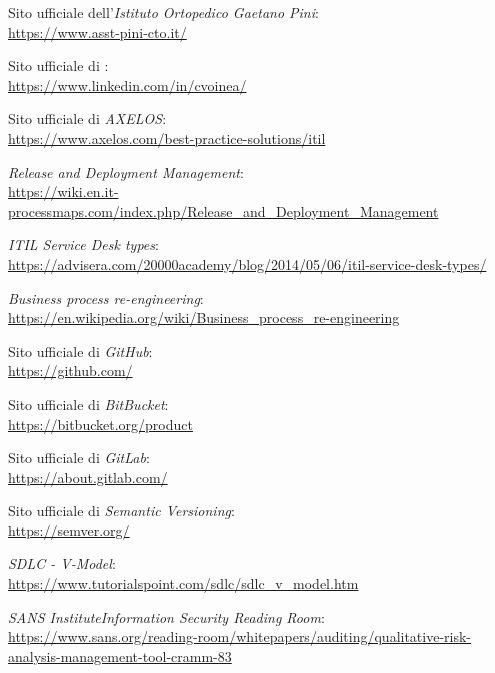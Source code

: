 \begin{thebibliography}{9}

	Sito ufficiale dell'\textit{Istituto Ortopedico Gaetano Pini}:\\
	\url{https://www.asst-pini-cto.it/}
	
	Sito ufficiale di \textit{\azienda}:\\
	\url{https://www.linkedin.com/in/cvoinea/}

	Sito ufficiale di \textit{AXELOS}:\\
	\url{https://www.axelos.com/best-practice-solutions/itil}

	\textit{Release and Deployment Management}:\\
	\url{https://wiki.en.it-processmaps.com/index.php/Release_and_Deployment_Management}

	\textit{ITIL Service Desk types}:\\
	\url{https://advisera.com/20000academy/blog/2014/05/06/itil-service-desk-types/}
	
	\textit{Business process re-engineering}:\\
	\url{https://en.wikipedia.org/wiki/Business_process_re-engineering}
	

	Sito ufficiale di \textit{GitHub}:\\
	\url{https://github.com/}

	Sito ufficiale di \textit{BitBucket}:\\
	\url{https://bitbucket.org/product}

	Sito ufficiale di \textit{GitLab}:\\
	\url{https://about.gitlab.com/}
	
	Sito ufficiale di \textit{Semantic Versioning}:\\
	\url{https://semver.org/}
	
	\textit{SDLC - V-Model}:\\
	\url{https://www.tutorialspoint.com/sdlc/sdlc_v_model.htm}

	\textit{SANS InstituteInformation Security Reading Room}:\\
	\url{https://www.sans.org/reading-room/whitepapers/auditing/qualitative-risk-analysis-management-tool-cramm-83}


%
%
\end{thebibliography}